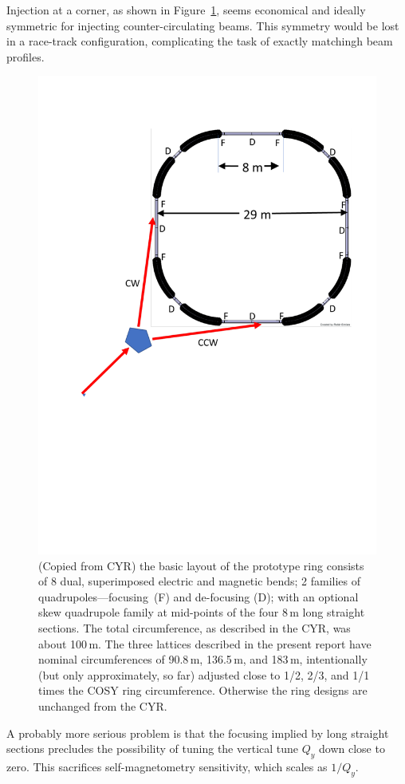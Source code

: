 \documentclass[]{article}
\begin{document}
Injection at a corner, as shown in Figure~\ref{fig:PTR-corner-injection}, seems economical 
and ideally symmetric for injecting counter-circulating beams. This symmetry would be lost
in a race-track configuration, complicating the task of exactly matchingh beam profiles.
%
\begin{figure}[htbp]
\centering
\includegraphics[scale=0.50]{pdf/Fig-4-injection3.pdf}
\caption{\label{fig:PTR-corner-injection}(Copied from CYR) the basic layout of the prototype ring 
consists of 8 dual, superimposed electric and magnetic bends; 2 families of quadrupoles---focusing~(F) 
and de-focusing (D); 
with an optional skew quadrupole family at mid-points of the four 8\,m long straight sections. 
The total circumference, as described in the CYR, was about 100\,m. The three lattices described in
the present report have nominal circumferences of 90.8\,m, 136.5\,m, and 183\,m, intentionally 
(but only approximately, so far) adjusted close to 1/2, 2/3, and 1/1 times the COSY ring circumference. 
Otherwise the ring designs are unchanged from the CYR.} 
\end{figure}
%
A probably more serious problem is that the focusing implied by long straight sections
precludes the possibility of tuning the vertical tune $Q_y$ down close to zero. 
This sacrifices self-magnetometry sensitivity, which scales as $1/Q_y$.
\end{document}

